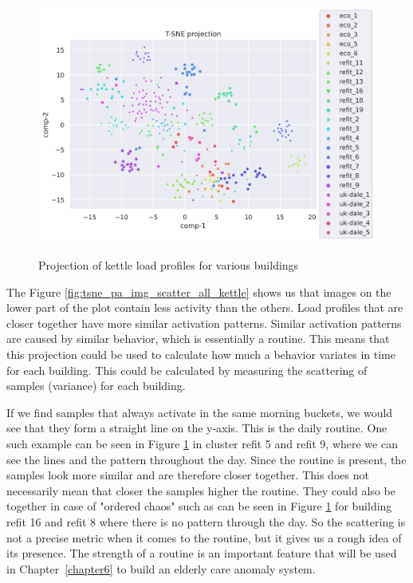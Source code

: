 \begin{figure}[H]
	\centering
	\caption{Projection of kettle load profiles for various buildings}
	\includegraphics[width=1.2\textwidth]{Figures/TSNE/TSNE_per_appliance/all/scatter_all_kettle.png}
	\label{fig:tsne_pa_scatter_all_kettle}
\end{figure}

The Figure \ref{fig:tsne_pa_img_scatter_all_kettle} shows us that images on the lower part 
of the plot contain less activity than the others. 
Load profiles that are closer together have more similar activation patterns.
Similar activation patterns are caused by similar behavior, which is essentially a routine.
This means that this projection could be used to calculate how much a behavior variates in time for each building.
This could be calculated by measuring the scattering of samples (variance) for each building.

If we find samples that always activate in the same morning buckets, we would see that they form a straight line on the y-axis.
This is the daily routine. One such example can be seen in Figure \ref{fig:tsne_pa_scatter_all_kettle} in cluster refit 5 and refit 9, where we can see the lines and the pattern throughout the day. 
Since the routine is present, the samples look more similar and are therefore closer together. 
This does not necessarily mean that closer the samples higher the routine.
They could also be together in case of "ordered chaos" such as can be seen in Figure \ref{fig:tsne_pa_scatter_all_kettle} for building refit 16 and refit 8 where there is no pattern through the day.
So the scattering is not a precise metric when it comes to the routine, but it gives us a rough idea of its presence.
The strength of a routine is an important feature that will be used
in Chapter \ref{chapter6} to build an elderly care anomaly system.

